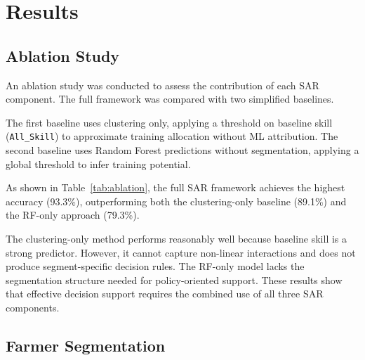 \documentclass[3p,twocolumn,authoryear]{elsarticle}
\begin{document}
\section{Results}

\subsection{Ablation Study}

An ablation study was conducted to assess the contribution of each SAR
component. The full framework was compared with two simplified baselines.

The first baseline uses clustering only, applying a threshold on baseline skill
(\texttt{All\_Skill}) to approximate training allocation without ML attribution.
The second baseline uses Random Forest predictions without segmentation,
applying a global threshold to infer training potential.

As shown in Table~\ref{tab:ablation}, the full SAR framework achieves the
highest accuracy (93.3\%), outperforming both the clustering-only baseline
(89.1\%) and the RF-only approach (79.3\%).

The clustering-only method performs reasonably well because baseline skill is a
strong predictor. However, it cannot capture non-linear interactions and does
not produce segment-specific decision rules. The RF-only model lacks the
segmentation structure needed for policy-oriented support. These results show
that effective decision support requires the combined use of all three SAR
components.

\begin{table}[htbp]
\centering
\caption{Ablation study comparing SAR with simplified baseline approaches}
\label{tab:ablation}
\end{table}

\subsection{Farmer Segmentation}
\end{document}
